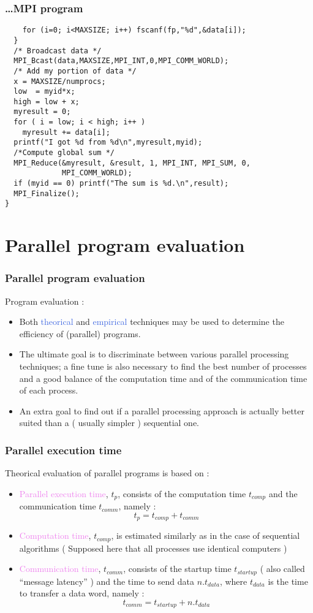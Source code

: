 \documentclass{beamer}
\begin{document}
\begin{frame}[fragile]
\frametitle{\ldots MPI program}
\begin{lstlisting}
    for (i=0; i<MAXSIZE; i++) fscanf(fp,"%d",&data[i]);
  }
  /* Broadcast data */
  MPI_Bcast(data,MAXSIZE,MPI_INT,0,MPI_COMM_WORLD);
  /* Add my portion of data */
  x = MAXSIZE/numprocs;
  low  = myid*x;
  high = low + x;
  myresult = 0;
  for ( i = low; i < high; i++ )
    myresult += data[i];
  printf("I got %d from %d\n",myresult,myid);
  /*Compute global sum */
  MPI_Reduce(&myresult, &result, 1, MPI_INT, MPI_SUM, 0, 
             MPI_COMM_WORLD);
  if (myid == 0) printf("The sum is %d.\n",result);
  MPI_Finalize();
}
\end{lstlisting}
\end{frame}
\section{Parallel program evaluation}
\begin{frame}
\frametitle{Parallel program evaluation}

\alert{Program evaluation} :
\begin{itemize}
\item Both \textcolor{royalblue}{theorical} and
  \textcolor{royalblue}{empirical} techniques may be used
to determine the efficiency of (parallel) programs.
\item The ultimate goal is to discriminate between various
parallel processing techniques; a fine tune is also necessary
to find the best \alert{number of processes} and a good balance
of the \alert{computation time} and of the \alert{communication
time} of each process.
\item An extra goal to find out if a parallel processing approach
is actually better suited than a ( usually simpler ) sequential one.
\end{itemize}
\end{frame}

\begin{frame}
\frametitle{Parallel execution time}
\small
\alert{Theorical evaluation of parallel programs} is based on :
\begin{itemize}
\item \textcolor{violet}{Parallel execution time}, $t_{p}$,
  consists of the \alert{computation time} $t_{comp}$ and
  the \alert{communication time} $t_{comm}$, namely :
  \[
  t_{p} = t_{comp} + t_{comm}
  \]
\item \textcolor{violet}{Computation time}, $t_{comp}$,
  is estimated similarly as in the case of sequential
   algorithms ( Supposed here that all processes use identical
   computers )
 \item \textcolor{violet}{Communication time}, $t_{comm}$,
   consists of the \alert{startup time} $t_{startup}$
   ( also called ``message latency'' ) and the
   \alert{time to send data} $n.t_{data}$, where
   $t_{data}$ is the time to transfer a data word, namely :
   \[
   t_{comm} = t_{startup} + n.t_{data}
   \]
 \end{itemize}
\end{frame}
\end{document}
